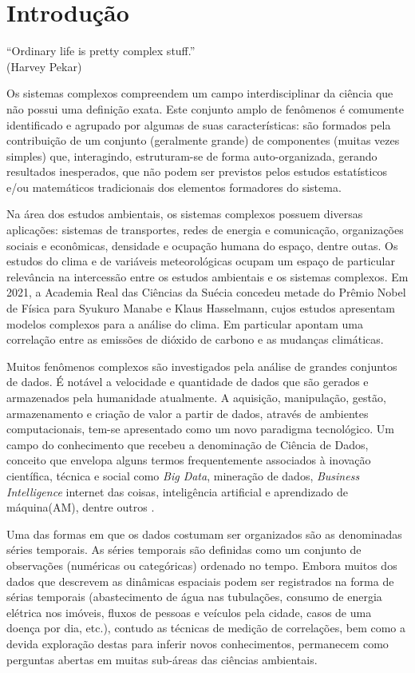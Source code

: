 \chapter{Introdução}
\label{cap:introducao}


\begin{flushright}
``Ordinary life is pretty complex stuff.''\\
(Harvey Pekar)
\end{flushright}

Os sistemas complexos compreendem um campo interdisciplinar da ciência que não possui uma definição exata. Este conjunto amplo de fenômenos é comumente identificado e agrupado por algumas de suas características: são formados pela contribuição de um conjunto (geralmente grande) de componentes (muitas vezes simples) que, interagindo, estruturam-se de forma auto-organizada, gerando resultados inesperados, que não podem ser previstos pelos estudos estatísticos e/ou matemáticos tradicionais dos elementos formadores do sistema.

Na área dos estudos ambientais, os sistemas complexos possuem diversas aplicações: sistemas de transportes, redes de energia e comunicação, organizações sociais e econômicas, densidade e ocupação humana do espaço, dentre outas. Os estudos do clima e de variáveis meteorológicas ocupam um espaço de particular relevância na intercessão entre os estudos ambientais e os sistemas complexos. Em 2021, a Academia Real das Ciências da Suécia concedeu metade do Prêmio Nobel de Física para Syukuro Manabe e Klaus Hasselmann, cujos estudos apresentam modelos complexos para a análise do clima. Em particular apontam uma correlação entre as emissões de dióxido de carbono e as mudanças climáticas.

Muitos fenômenos complexos são investigados pela análise de grandes conjuntos de dados. É notável a velocidade e quantidade de dados que são gerados e armazenados pela humanidade atualmente. A aquisição, manipulação, gestão, armazenamento e criação de valor a partir de dados, através de ambientes computacionais, tem-se apresentado como um novo paradigma tecnológico. Um campo do conhecimento que recebeu a denominação de Ciência de Dados, conceito que envelopa alguns termos frequentemente associados à inovação científica, técnica e social como \emph{Big Data}, mineração de dados, \emph{Business Intelligence} internet das coisas, inteligência artificial e aprendizado de máquina(AM), dentre outros \cite[p. 12-13]{EMCdata2015}.

Uma das formas em que os dados costumam ser organizados são as denominadas séries temporais. As séries temporais são definidas como um conjunto de observações (numéricas ou categóricas) ordenado no tempo.  Embora muitos dos dados que descrevem as dinâmicas espaciais podem ser registrados na forma de sérias temporais (abastecimento de água nas tubulações, consumo de energia elétrica nos imóveis, fluxos de pessoas e veículos pela cidade, casos de uma doença por dia, etc.), contudo as técnicas de medição de correlações, bem como a devida exploração destas para inferir novos conhecimentos, permanecem como perguntas abertas em muitas sub-áreas das ciências ambientais\cite{Bermudez-Edo2018}.

